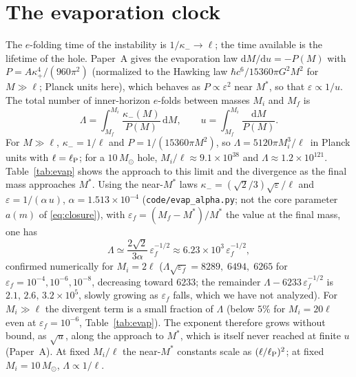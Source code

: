 \documentclass[11pt]{article}
\newcommand{\Msun}{M_\odot}
\newcommand{\dd}{\mathrm{d}}
\begin{document}
\section{The evaporation clock}
\label{sec:evap}

The $e$-folding time of the instability is $1/\kappa_-\to\ell$; the time available is the lifetime of the hole. Paper~A \citep{PaperA} gives the evaporation law $\dd M/\dd u=-P(M)$ with $P=A\kappa_+^4/(960\pi^2)$ (normalized to the Hawking law \citep{Hawking1975,Page1976} $\hbar c^6/15360\pi G^2M^2$ for $M\gg\ell$; Planck units here), which behaves as $P\propto\varepsilon^2$ near $M^*$, so that $\varepsilon\propto1/u$. The total number of inner-horizon $e$-folds between masses $M_i$ and $M_f$ is
\begin{equation}
\Lambda=\int_{M_f}^{M_i}\frac{\kappa_-(M)}{P(M)}\,\dd M,\qquad u=\int_{M_f}^{M_i}\frac{\dd M}{P(M)}.
\label{eq:Lambda}
\end{equation}
For $M\gg\ell$, $\kappa_-=1/\ell$ and $P=1/(15360\pi M^2)$, so $\Lambda=5120\pi M_i^3/\ell\,$ in Planck units with $\ell=\ell_{\rm P}$; for a $10\,\Msun$ hole, $M_i/\ell\approx9.1\times10^{38}$ and $\Lambda\approx1.2\times10^{121}$. Table~\ref{tab:evap} shows the approach to this limit and the divergence as the final mass approaches $M^*$. Using the near-$M^*$ laws $\kappa_-=(\sqrt2/3)\sqrt\varepsilon/\ell$ and $\varepsilon=1/(\alpha\,u)$, $\alpha=1.513\times10^{-4}$ (\texttt{code/evap\_alpha.py}; not the core parameter $a(m)$ of \eqref{eq:closure}), with $\varepsilon_f=(M_f-M^*)/M^*$ the value at the final mass, one has
\begin{equation}
\Lambda\simeq\frac{2\sqrt2}{3\alpha}\,\varepsilon_f^{-1/2}\approx6.23\times10^{3}\,\varepsilon_f^{-1/2},
\end{equation}
confirmed numerically for $M_i=2\ell$ ($\Lambda\sqrt{\varepsilon_f}=8289,\;6494,\;6265$ for $\varepsilon_f=10^{-4},10^{-6},10^{-8}$, decreasing toward $6233$; the remainder $\Lambda-6233\,\varepsilon_f^{-1/2}$ is $2.1,\,2.6,\,3.2\times10^{5}$, slowly growing as $\varepsilon_f$ falls, which we have not analyzed). For $M_i\gg\ell$ the divergent term is a small fraction of $\Lambda$ (below $5\%$ for $M_i=20\ell$ even at $\varepsilon_f=10^{-6}$, Table~\ref{tab:evap}). The exponent therefore grows without bound, as $\sqrt u$, along the approach to $M^*$, which is itself never reached at finite $u$ (Paper~A). At fixed $M_i/\ell$ the near-$M^*$ constants scale as $(\ell/\ell_{\rm P})^2$; at fixed $M_i=10\,\Msun$, $\Lambda\propto1/\ell$.
\end{document}
